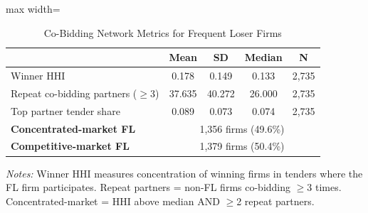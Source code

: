 \begin{table}[htbp]
\centering
\caption{Co-Bidding Network Metrics for Frequent Loser Firms}
\label{tab:fl_network_summary}
\begin{adjustbox}{max width=\textwidth}
\begin{threeparttable}
\small
\begin{tabular}{lcccc}
\toprule
 & Mean & SD & Median & N \\
\midrule
Winner HHI & 0.178 & 0.149 & 0.133 & 2,735 \\
Repeat co-bidding partners ($\geq$3) & 37.635 & 40.272 & 26.000 & 2,735 \\
Top partner tender share & 0.089 & 0.073 & 0.074 & 2,735 \\
\midrule
\textbf{Concentrated-market FL} & \multicolumn{4}{c}{1,356 firms (49.6\%)} \\
\textbf{Competitive-market FL} & \multicolumn{4}{c}{1,379 firms (50.4\%)} \\
\bottomrule
\end{tabular}
\begin{tablenotes}
\small
\item \textit{Notes:} Winner HHI measures concentration of winning firms in tenders
where the FL firm participates. Repeat partners = non-FL firms co-bidding $\geq$3 times.
Concentrated-market = HHI above median AND $\geq$2 repeat partners.
\end{tablenotes}
\end{threeparttable}
\end{adjustbox}
\end{table}
